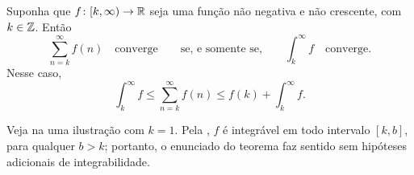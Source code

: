 \begin{prop}
Suponha que $f \colon [k,\infty) \to {\mathbb{R}}$ seja uma função não negativa e
não crescente, com $k \in {\mathbb{Z}}$. Então
\begin{equation*}
\sum_{n=k}^\infty f(n)
\quad \text{converge} \qquad \text{se, e somente se,}
\qquad
\int_k^\infty f
\quad \text{converge}.
\end{equation*}
Nesse caso,
\begin{equation*}
\int_k^\infty f
\leq
\sum_{n=k}^\infty f(n)
\leq
f(k)+
\int_k^\infty f .
\end{equation*}
\end{prop}
Veja na  uma ilustração com $k=1$.
Pela , $f$ é integrável em todo intervalo
$[k,b]$, para qualquer $b>k$; portanto, o enunciado do teorema faz sentido
sem hipóteses adicionais de integrabilidade.
\begin{myfigureht}
\caption{A área sob a curva, $\int_1^\infty f$, é limitada inferiormente
pela área dos retângulos sombreados, $f(2)+f(3)+f(4)+\cdots$, e
superiormente pela área de todos os retângulos, sombreados ou não,
$f(1)+f(2)+f(3)+\cdots$.\label{fig:integraltest}}
\end{myfigureht}

